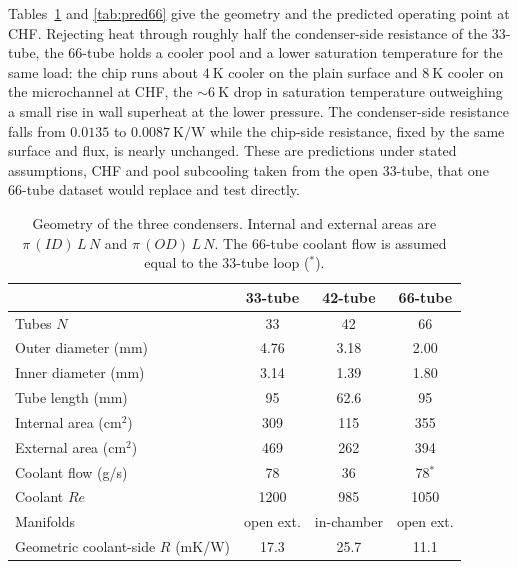 \documentclass[11pt]{article}
\begin{document}
Tables~\ref{tab:geom66} and \ref{tab:pred66} give the geometry and the predicted operating point at
CHF. Rejecting heat through roughly half the condenser-side resistance of the 33-tube, the 66-tube
holds a cooler pool and a lower saturation temperature for the same load: the chip runs about
$4~\mathrm{K}$ cooler on the plain surface and $8~\mathrm{K}$ cooler on the microchannel at CHF,
the $\sim\!6~\mathrm{K}$ drop in saturation temperature outweighing a small rise in wall superheat
at the lower pressure. The condenser-side resistance falls from $0.0135$ to $0.0087~\mathrm{K/W}$
while the chip-side resistance, fixed by the same surface and flux, is nearly unchanged. These are
predictions under stated assumptions, CHF and pool subcooling taken from the open 33-tube, that
one 66-tube dataset would replace and test directly.

\begin{table}[H]
\centering
\caption{Geometry of the three condensers. Internal and external areas are $\pi\,(ID)\,L\,N$ and
$\pi\,(OD)\,L\,N$. The 66-tube coolant flow is assumed equal to the 33-tube loop ($^\ast$).}
\label{tab:geom66}
\begin{tabular}{lccc}
\toprule
 & 33-tube & 42-tube & 66-tube\\
\midrule
Tubes $N$ & 33 & 42 & 66\\
Outer diameter (mm) & 4.76 & 3.18 & 2.00\\
Inner diameter (mm) & 3.14 & 1.39 & 1.80\\
Tube length (mm) & 95 & 62.6 & 95\\
Internal area (cm$^2$) & 309 & 115 & 355\\
External area (cm$^2$) & 469 & 262 & 394\\
Coolant flow (g/s) & 78 & 36 & 78$^\ast$\\
Coolant $Re$ & 1200 & 985 & 1050\\
Manifolds & open ext. & in-chamber & open ext.\\
Geometric coolant-side $R$ (mK/W) & 17.3 & 25.7 & 11.1\\
\bottomrule
\end{tabular}
\end{table}
\end{document}
